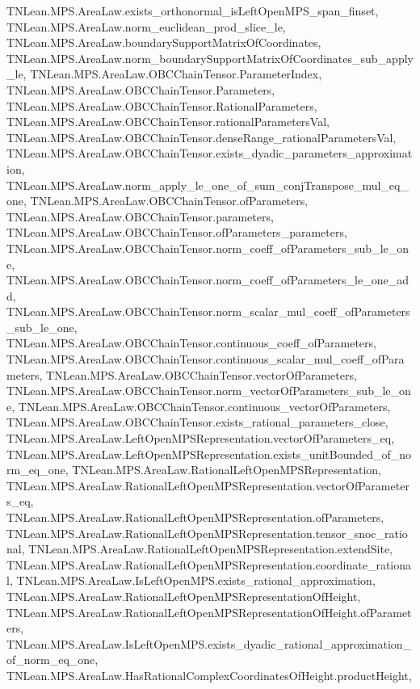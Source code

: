 \begin{lemma}
{        TNLean.MPS.AreaLaw.exists_orthonormal_isLeftOpenMPS_span_finset,
        TNLean.MPS.AreaLaw.norm_euclidean_prod_slice_le,
        TNLean.MPS.AreaLaw.boundarySupportMatrixOfCoordinates,
        TNLean.MPS.AreaLaw.norm_boundarySupportMatrixOfCoordinates_sub_apply_le,
        TNLean.MPS.AreaLaw.OBCChainTensor.ParameterIndex,
        TNLean.MPS.AreaLaw.OBCChainTensor.Parameters,
        TNLean.MPS.AreaLaw.OBCChainTensor.RationalParameters,
        TNLean.MPS.AreaLaw.OBCChainTensor.rationalParametersVal,
        TNLean.MPS.AreaLaw.OBCChainTensor.denseRange_rationalParametersVal,
        TNLean.MPS.AreaLaw.OBCChainTensor.exists_dyadic_parameters_approximation,
        TNLean.MPS.AreaLaw.norm_apply_le_one_of_sum_conjTranspose_mul_eq_one,
        TNLean.MPS.AreaLaw.OBCChainTensor.ofParameters,
        TNLean.MPS.AreaLaw.OBCChainTensor.parameters,
        TNLean.MPS.AreaLaw.OBCChainTensor.ofParameters_parameters,
        TNLean.MPS.AreaLaw.OBCChainTensor.norm_coeff_ofParameters_sub_le_one,
        TNLean.MPS.AreaLaw.OBCChainTensor.norm_coeff_ofParameters_le_one_add,
        TNLean.MPS.AreaLaw.OBCChainTensor.norm_scalar_mul_coeff_ofParameters_sub_le_one,
        TNLean.MPS.AreaLaw.OBCChainTensor.continuous_coeff_ofParameters,
        TNLean.MPS.AreaLaw.OBCChainTensor.continuous_scalar_mul_coeff_ofParameters,
        TNLean.MPS.AreaLaw.OBCChainTensor.vectorOfParameters,
        TNLean.MPS.AreaLaw.OBCChainTensor.norm_vectorOfParameters_sub_le_one,
        TNLean.MPS.AreaLaw.OBCChainTensor.continuous_vectorOfParameters,
        TNLean.MPS.AreaLaw.OBCChainTensor.exists_rational_parameters_close,
        TNLean.MPS.AreaLaw.LeftOpenMPSRepresentation.vectorOfParameters_eq,
        TNLean.MPS.AreaLaw.LeftOpenMPSRepresentation.exists_unitBounded_of_norm_eq_one,
        TNLean.MPS.AreaLaw.RationalLeftOpenMPSRepresentation,
        TNLean.MPS.AreaLaw.RationalLeftOpenMPSRepresentation.vectorOfParameters_eq,
        TNLean.MPS.AreaLaw.RationalLeftOpenMPSRepresentation.ofParameters,
        TNLean.MPS.AreaLaw.RationalLeftOpenMPSRepresentation.tensor_snoc_rational,
        TNLean.MPS.AreaLaw.RationalLeftOpenMPSRepresentation.extendSite,
        TNLean.MPS.AreaLaw.RationalLeftOpenMPSRepresentation.coordinate_rational,
        TNLean.MPS.AreaLaw.IsLeftOpenMPS.exists_rational_approximation,
        TNLean.MPS.AreaLaw.RationalLeftOpenMPSRepresentationOfHeight,
        TNLean.MPS.AreaLaw.RationalLeftOpenMPSRepresentationOfHeight.ofParameters,
        TNLean.MPS.AreaLaw.IsLeftOpenMPS.exists_dyadic_rational_approximation_of_norm_eq_one,
        TNLean.MPS.AreaLaw.HasRationalComplexCoordinatesOfHeight.productHeight,
}
\end{lemma}

